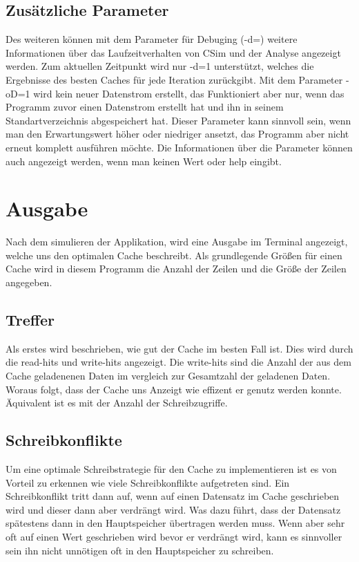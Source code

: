 \documentclass{scrreprt}
\begin{document}
\subsection{Zusätzliche Parameter}
Des weiteren können mit dem Parameter für Debuging (-d=) weitere Informationen über das Laufzeitverhalten von CSim und der Analyse angezeigt werden. Zum aktuellen Zeitpunkt wird nur -d=1 unterstützt, welches die Ergebnisse des besten Caches für jede Iteration zurückgibt.\newline
Mit dem Parameter -oD=1 wird kein neuer Datenstrom erstellt, das Funktioniert aber nur, wenn das Programm zuvor einen Datenstrom erstellt hat und ihn in seinem Standartverzeichnis abgespeichert hat. Dieser Parameter kann sinnvoll sein, wenn man den Erwartungswert höher oder niedriger ansetzt, das Programm aber nicht erneut komplett ausführen möchte. \newline
Die Informationen über die Parameter können auch angezeigt werden, wenn man keinen Wert oder help eingibt.

\section{Ausgabe}

Nach dem simulieren der Applikation, wird eine Ausgabe im Terminal angezeigt, welche uns den optimalen Cache beschreibt. Als grundlegende Größen für einen Cache wird in diesem Programm die Anzahl der Zeilen und die Größe der Zeilen angegeben.

\subsection{Treffer}

Als erstes wird beschrieben, wie gut der Cache im besten Fall ist. Dies wird durch die read-hits und write-hits angezeigt. Die write-hits sind die Anzahl der aus dem Cache geladenenen Daten im vergleich zur Gesamtzahl der geladenen Daten. Woraus folgt, dass der Cache uns Anzeigt wie effizent er genutz werden konnte. Äquivalent ist es mit der Anzahl der Schreibzugriffe.

\subsection{Schreibkonflikte}

Um eine optimale Schreibstrategie für den Cache zu implementieren ist es von Vorteil zu erkennen wie viele Schreibkonflikte aufgetreten sind. Ein Schreibkonflikt tritt dann auf, wenn auf einen Datensatz im Cache geschrieben wird und dieser dann aber verdrängt wird. Was dazu führt, dass der Datensatz spätestens dann in den Hauptspeicher übertragen werden muss. Wenn aber sehr oft auf einen Wert geschrieben wird bevor er verdrängt wird, kann es sinnvoller sein ihn nicht unnötigen oft in den Hauptspeicher zu schreiben.
\end{document}
